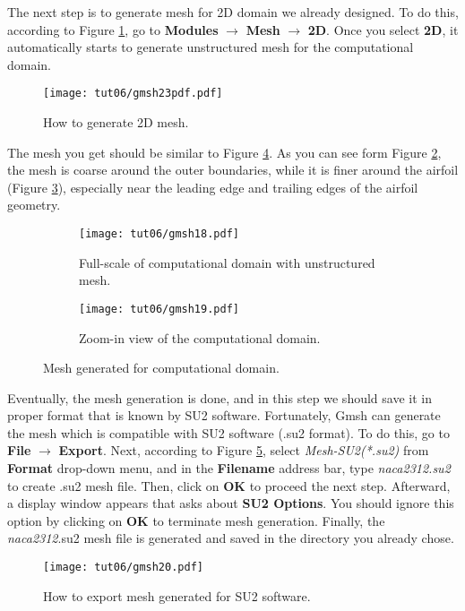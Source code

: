 The next step is to generate mesh for 2D domain we already designed. To do this, according to Figure \ref{fig6:gmsh23}, go to \textbf{Modules} $\rightarrow$ \textbf{Mesh} $\rightarrow$ \textbf{2D}. Once you select \textbf{2D}, it  automatically starts to generate unstructured mesh for the computational domain.
\begin{figure}[htbp]
    \centering
    \texttt{[image: tut06/gmsh23pdf.pdf]}
    \caption{How to generate 2D mesh.}
    \label{fig6:gmsh23}
\end{figure}
The mesh you get should be similar to Figure \ref{fig6:gmsh18}. As you can see form Figure \ref{fig6:gmsh18 a}, the mesh is coarse around the outer boundaries, while it is finer around the airfoil (Figure \ref{fig6:gmsh18 b}), especially near the leading edge and trailing edges of the airfoil geometry.
\begin{figure}[htbp]
    \centering
     \begin{subfigure}[b]{.75\textwidth}
         \centering
         \texttt{[image: tut06/gmsh18.pdf]}
         \caption{Full-scale of computational domain with unstructured mesh.}
         \label{fig6:gmsh18 a}
     \end{subfigure}
     \hfill
     \begin{subfigure}[b]{.75\textwidth}
         \centering
         \texttt{[image: tut06/gmsh19.pdf]}
         \caption{Zoom-in view of the computational domain.}
         \label{fig6:gmsh18 b}
     \end{subfigure}  
    \caption{Mesh generated for computational domain.}
    \label{fig6:gmsh18}
\end{figure}
Eventually, the mesh generation is done, and in this step we should save it in proper format that is known by SU2 software. Fortunately, Gmsh can generate the mesh which is compatible with SU2 software (.su2 format). To do this, go to \textbf{File} $\rightarrow$ \textbf{Export}. Next, according to Figure \ref{fig6:gmsh20}, select \textit{Mesh-SU2(*.su2)} from \textbf{Format} drop-down menu, and in the \textbf{Filename} address bar, type \textit{naca2312.su2} to create .su2 mesh file. Then, click on \textbf{OK} to proceed the next step. Afterward, a display window appears that asks about \textbf{SU2 Options}. You should ignore this option by clicking on \textbf{OK} to terminate mesh generation. Finally, the \textit{naca2312}.su2 mesh file is generated and saved in the directory you already chose.
\begin{figure}[htbp]
    \centering
    \texttt{[image: tut06/gmsh20.pdf]}
    \caption{How to export mesh generated for SU2 software.}
    \label{fig6:gmsh20}
\end{figure}

